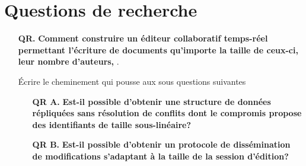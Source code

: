 
\section{Questions de recherche}

\begin{itemize}
\item [\textbf{QR.}] \textbf{Comment construire un éditeur collaboratif temps-réel
    permettant l'écriture de documents qu'importe la taille de ceux-ci, leur
    nombre d'auteurs,  }.

  Écrire le cheminement qui pousse aux sous questions suivantes
  \begin{itemize}
  \item [\textbf{QR A.}] \textbf{Est-il possible d'obtenir une structure de
      données répliquées sans résolution de conflits dont le compromis propose
      des identifiants de taille sous-linéaire?}
  \item [\textbf{QR B.}] \textbf{Est-il possible d'obtenir un protocole de
      dissémination de modifications s'adaptant à la taille de la session
      d'édition?}
  \end{itemize}
\end{itemize}